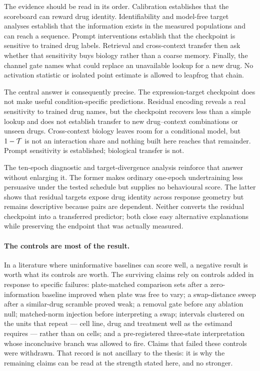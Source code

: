 The evidence should be read in its order. Calibration establishes that the scoreboard can reward
drug identity. Identifiability and model-free target analyses establish that the information exists
in the measured populations and can reach a sequence. Prompt interventions establish that the
checkpoint is sensitive to trained drug labels. Retrieval and cross-context transfer then ask
whether that sensitivity buys biology rather than a coarse memory. Finally, the channel gate names
what could replace an unavailable lookup for a new drug. No activation statistic or isolated point
estimate is allowed to leapfrog that chain.

The central answer is consequently precise. The expression-target checkpoint does not make useful
condition-specific predictions. Residual encoding reveals a real sensitivity to trained drug names,
but the checkpoint recovers less than a simple lookup and does not establish transfer to new
drug--context combinations or unseen drugs. Cross-context biology leaves room for a conditional
model, but $1-\mathcal{T}$ is not an interaction share and nothing built here reaches that remainder.
Prompt sensitivity is established; biological transfer is not.

The ten-epoch diagnostic and target-divergence analysis reinforce that answer without enlarging it.
The former makes ordinary one-epoch undertraining less persuasive under the tested schedule but
supplies no behavioural score. The latter shows that residual targets expose drug identity across
response geometry but remains descriptive because pairs are dependent. Neither converts the
residual checkpoint into a transferred predictor; both close easy alternative explanations while
preserving the endpoint that was actually measured.

\paragraph{The controls are most of the result.} In a literature where uninformative baselines can
score well, a negative result is worth what its controls are worth. The surviving claims rely on
controls added in response to specific failures: plate-matched comparison sets after a
zero-information baseline improved when plate was free to vary; a swap-distance sweep after a
similar-drug scramble proved weak; a removal gate before any ablation null; matched-norm injection
before interpreting a swap; intervals clustered on the units that repeat --- cell line, drug and
treatment well as the estimand requires --- rather than on cells; and a pre-registered three-state
interpretation whose inconclusive branch was allowed to fire. Claims that failed these controls were
withdrawn. That record is not ancillary to the thesis: it is why the remaining claims can be read at
the strength stated here, and no stronger.
